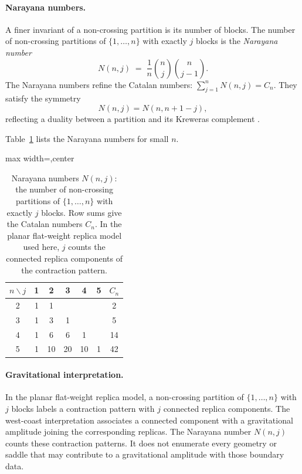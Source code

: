 \documentclass[11pt,letterpaper]{article}
\theoremstyle{plain}
\theoremstyle{definition}
\theoremstyle{remark}
\begin{document}
\paragraph{Narayana numbers.}
A finer invariant of a non-crossing partition is its number of blocks.
The number of non-crossing partitions of $\{1,\ldots,n\}$ with exactly
$j$ blocks is the \emph{Narayana number}
\begin{equation}
  N(n,j) \;=\; \frac{1}{n}\binom{n}{j}\binom{n}{j-1}.
  \label{eq07:narayana}
\end{equation}
The Narayana numbers refine the Catalan numbers:
$\sum_{j=1}^{n} N(n,j) = C_n$.  They satisfy the symmetry
\begin{equation}
  N(n,j) = N(n, n+1-j),
  \label{eq07:narayana_symmetry}
\end{equation}
reflecting a duality between a partition and its Kreweras
complement \cite{kreweras1972}.

Table~\ref{tab07:narayana} lists the Narayana numbers for small $n$.

\begin{table}[t]
\centering
\caption{Narayana numbers $N(n,j)$: the number of non-crossing partitions
  of $\{1,\ldots,n\}$ with exactly $j$ blocks.  Row sums give the Catalan
  numbers $C_n$. In the planar flat-weight replica model used here, $j$
  counts the connected replica components of the contraction pattern.}
\label{tab07:narayana}
\medskip
\begin{adjustbox}{max width=\textwidth,center}
\begin{tabular}{c|ccccc|c}
\toprule
$n \backslash j$ & 1 & 2 & 3 & 4 & 5 & $C_n$ \\
\midrule
2 & 1 & 1 & & & & 2 \\
3 & 1 & 3 & 1 & & & 5 \\
4 & 1 & 6 & 6 & 1 & & 14 \\
5 & 1 & 10 & 20 & 10 & 1 & 42 \\
\bottomrule
\end{tabular}
\end{adjustbox}
\end{table}

\paragraph{Gravitational interpretation.}
In the planar flat-weight replica model, a non-crossing partition of
$\{1,\ldots,n\}$ with $j$ blocks labels a contraction pattern with $j$
connected replica components. The west-coast interpretation associates a
connected component with a gravitational amplitude joining the corresponding
replicas. The Narayana number $N(n,j)$ counts these contraction patterns.
It does not enumerate every geometry or saddle that may contribute to a
gravitational amplitude with those boundary data.
\end{document}
